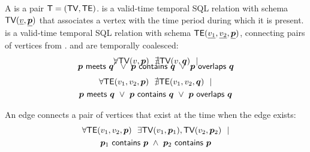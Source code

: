 \begin{definition}[TGraph]
A \tg is a pair $\mathsf{T}=(\textsf{TV}, \textsf{TE})$. \tv is a valid-time temporal SQL
relation with schema $\textsf{TV}(\underline{v}, \underline{\boldsymbol{p}})$ that
associates a vertex with the time period during which it is
present. \te is a valid-time temporal SQL relation with schema
$\textsf{TE}(\underline{v_1}, \underline{v_2}, \underline{\boldsymbol{p}})$, connecting
pairs of vertices from \tv.  \tv and \te are temporally coalesced:
\vspace{-0.3cm}
\begin{multline}
\vspace{-0.3cm}
\forall \tv(v, \bp)~~\nexists \tv(v, \bq)~~| \\
                       \pred{\bp}{meets}{\bq'}~\lor~\pred{\bp}{contains}{\bq}~\lor~\pred{\bp}{overlaps}{\bq}
\label{def:tg:c2}
\end{multline}
\vspace{-0.7cm}
\begin{multline}
\forall \textsf{TE}(v_1, v_2, \boldsymbol{p})~~\nexists \textsf{TE}(v_1,v_2, \boldsymbol{q})~~| \\
                       \boldsymbol{p}~\mathsf{meets}~\boldsymbol{q}~\lor~\boldsymbol{p}~\mathsf{contains}~\boldsymbol{q}~\lor~\boldsymbol{p}~\mathsf{overlaps}~\boldsymbol{q}
\label{def:tg:c3}
\end{multline}

An edge connects a pair of vertices that exist at the time when the edge exists:
\vspace{-0.3cm}
\begin{multline}
\forall \textsf{TE}(v_1, v_2, \boldsymbol{p})~~\exists \textsf{TV}(v_1, \boldsymbol{p}_1), \textsf{TV}(v_2, \boldsymbol{p}_2)~~| \\
                       \boldsymbol{p}_1~\mathsf{contains}~\boldsymbol{p}~\wedge~\boldsymbol{p}_2~\mathsf{contains}~\boldsymbol{p}
\label{def:tg:c1}
\end{multline}
\vspace{-0.5cm}


\end{definition}
